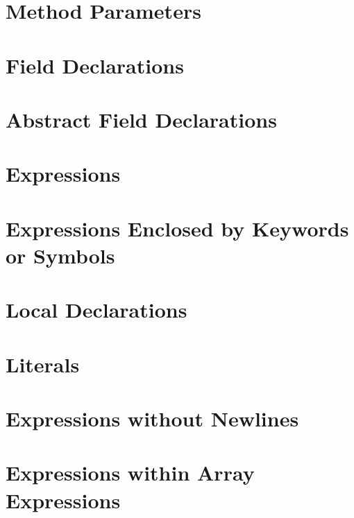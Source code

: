 \section{Method Parameters}


\section{Field Declarations}


\section{Abstract Field Declarations}


\section{Expressions}


\section{Expressions Enclosed by Keywords or Symbols}


\section{Local Declarations}


\section{Literals}


\section{Expressions without Newlines}


\section{Expressions within Array Expressions}


